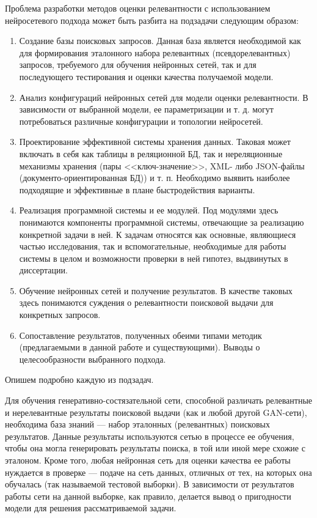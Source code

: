 Проблема разработки методов оценки релевантности с использованием нейросетевого подхода может быть
разбита на подзадачи следующим образом:
\begin{enumerate}[1)]
    \item Создание базы поисковых запросов. Данная база является необходимой как для формирования эталонного
          набора релевантных (псевдорелевантных) запросов, требуемого для обучения нейронных сетей, так и для последующего
          тестирования и оценки качества получаемой модели.
    \item Анализ конфигураций нейронных сетей для модели оценки релевантности. В зависимости от выбранной модели,
          ее параметризации и т. д. могут потребоваться различные конфигурации и топологии нейросетей.
    \item Проектирование эффективной системы хранения данных. Таковая может включать в себя как таблицы в реляционной
          БД, так и нереляционные механизмы хранения (пары <<ключ-значение>>, XML- либо JSON-файлы (документо-ориентированная БД))
          и т. п. Необходимо выявить наиболее подходящие и эффективные в плане быстродействия варианты.
    \item Реализация программной системы и ее модулей. Под модулями здесь понимаются компоненты программной системы,
          отвечающие за реализацию конкретной задачи в ней. К задачам относятся как основные, являющиеся частью исследования,
          так и вспомогательные, необходимые для работы системы в целом и возможности проверки в ней гипотез, выдвинутых в диссертации.
    \item Обучение нейронных сетей и получение результатов. В качестве таковых здесь понимаются суждения о релевантности
          поисковой выдачи для конкретных запросов.
    \item Сопоставление результатов, полученных обеими типами методик (предлагаемыми в данной работе и существующими).
          Выводы о целесообразности выбранного подхода.
\end{enumerate}

Опишем подробно каждую из подзадач.

Для обучения генеративно-состязательной сети, способной различать релевантные и нерелевантные результаты поисковой выдачи
(как и любой другой GAN-сети), необходима база знаний --- набор эталонных (релевантных) поисковых результатов. Данные результаты
используются сетью в процессе ее обучения, чтобы она могла генерировать результаты поиска, в той или иной мере схожие с эталоном.
Кроме того, любая нейронная сеть для оценки качества ее работы нуждается в проверке --- подаче на сеть данных, отличных от тех,
на которых она обучалась (так называемой тестовой выборки). В зависимости от результатов работы сети на данной выборке, как правило,
делается вывод о пригодности модели для решения рассматриваемой задачи.

